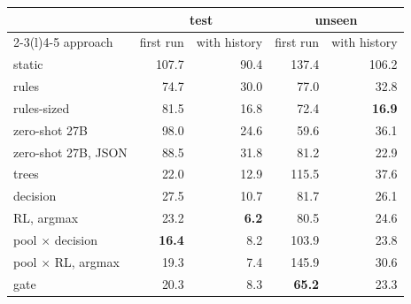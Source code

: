 \begin{tabular}{@{}lrrrr@{}}
\toprule
& \multicolumn{2}{c}{test} & \multicolumn{2}{c}{unseen} \\
\cmidrule(lr){2-3}\cmidrule(l){4-5}
approach & first run & with history & first run & with history \\
\midrule
static & 107.7 & 90.4 & 137.4 & 106.2 \\
rules & 74.7 & 30.0 & 77.0 & 32.8 \\
rules-sized & 81.5 & 16.8 & 72.4 & \textbf{16.9} \\
zero-shot 27B & 98.0 & 24.6 & 59.6 & 36.1 \\
zero-shot 27B, JSON & 88.5 & 31.8 & 81.2 & 22.9 \\
trees & 22.0 & 12.9 & 115.5 & 37.6 \\
decision & 27.5 & 10.7 & 81.7 & 26.1 \\
RL, argmax & 23.2 & \textbf{6.2} & 80.5 & 24.6 \\
pool $\times$ decision & \textbf{16.4} & 8.2 & 103.9 & 23.8 \\
pool $\times$ RL, argmax & 19.3 & 7.4 & 145.9 & 30.6 \\
gate & 20.3 & 8.3 & \textbf{65.2} & 23.3 \\
\bottomrule
\end{tabular}
